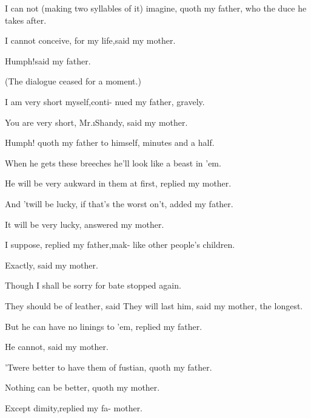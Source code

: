 \documentclass[twoside]{article}
\begin{document}
\tsh I can not (making two syllables\break
of it) imagine, quoth my father, who\break
the duce he takes after.\tsh

I cannot conceive, for my life,\tsk said\break 
my mother.\tsh

\eject

Humph!\tsh\topstrut said my father.

(The dialogue ceased for a moment.)

\tsh I am very short myself,\tsk conti-\break 
nued my father, gravely.

You are very short, Mr.\@ \i{Shandy},\tsk\break
said my mother.

Humph! quoth my father to himself,\break
{} 
minutes and a half.

\tsh When he gets these breeches\break
{} 
he’ll look like a beast in ’em.

\eject

\topstrut He will be very aukward in them at\break
first, replied my mother.\tsh

\tsh And ’twill be lucky, if that’s\break
the worst on’t, added my father.

It will be very lucky, answered my\break
mother.

I suppose, replied my father,\tsk mak-\break 
{} 
like other people’s children.\tsh

Exactly, said my mother.\tsh

\tsh Though I shall be sorry for\break
{}
bate stopped again.

\tsh They should be of leather, said\break
{}
They will last him, said my mother, the\break
longest.

But he can have no linings to ’em,\break
replied my father.\tsh

He cannot, said my mother.

’Twere better to have them of fustian,\break
quoth my father.

Nothing can be better, quoth my\break
mother.\tsh

\tsh Except dimity,\tsk replied my fa-\break 
{}
mother.
\end{document}
